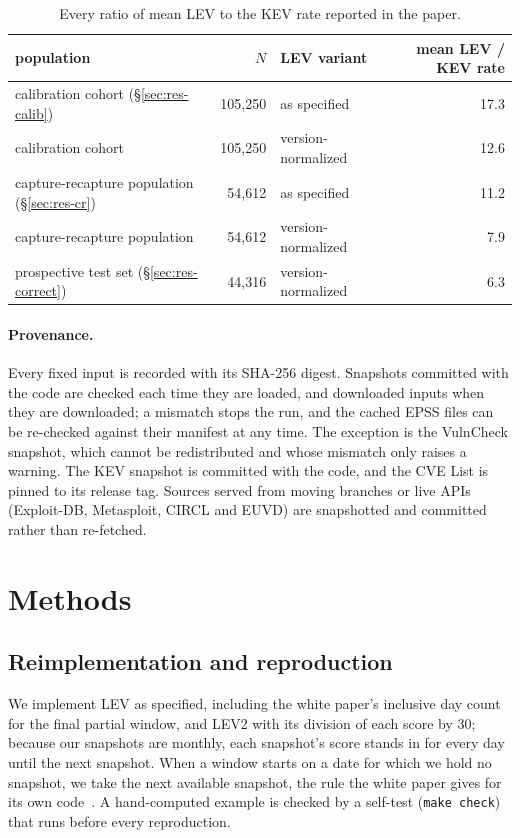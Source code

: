 \begin{table}[t]
\centering\small
\caption{Every ratio of mean LEV to the KEV rate reported in the paper.}\label{tab:ratios}
\begin{tabular}{@{}lrlr@{}}
\toprule
population & $N$ & LEV variant & mean LEV / KEV rate \\
\midrule
calibration cohort (\S\ref{sec:res-calib}) & 105,250 & as specified & 17.3\x \\
calibration cohort & 105,250 & version-normalized & 12.6\x \\
capture-recapture population (\S\ref{sec:res-cr}) & 54,612 & as specified & 11.2\x \\
capture-recapture population & 54,612 & version-normalized & 7.9\x \\
prospective test set (\S\ref{sec:res-correct}) & 44,316 & version-normalized & 6.3\x \\
\bottomrule
\end{tabular}
\end{table}

\paragraph{Provenance.} Every fixed input is recorded with its SHA-256 digest.
Snapshots committed with the code are checked each time they are loaded, and
downloaded inputs when they are downloaded; a mismatch stops the run, and the
cached EPSS files can be re-checked against their manifest at any time. The
exception is the VulnCheck snapshot, which cannot be redistributed and whose
mismatch only raises a warning. The KEV snapshot is committed with the code,
and the CVE List is pinned to its release tag.
Sources served from moving branches or live APIs (Exploit-DB, Metasploit, CIRCL
and EUVD) are snapshotted and committed rather than re-fetched.

\section{Methods}\label{sec:methods}

\subsection{Reimplementation and reproduction}\label{sec:m-repro}

We implement LEV as specified, including the white paper's inclusive day count
for the final partial window, and LEV2 with its division of each score by 30;
because our snapshots are monthly, each snapshot's score stands in for every
day until the next snapshot. When a window starts on a date for which we hold no snapshot, we take
the next available snapshot, the rule the white paper gives for its own
code~\cite[Sec.~10.3]{mell2025lev}. A hand-computed example is checked by a self-test
(\texttt{make check}) that runs before every reproduction.

